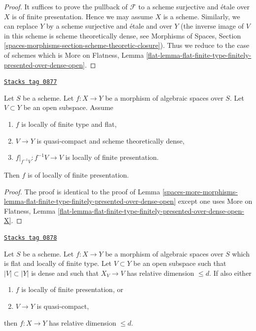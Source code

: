 \begin{proof}
It suffices to prove the pullback of $\mathcal{F}$ to a scheme surjective
and \'etale over $X$ is of finite presentation. Hence we may assume $X$
is a scheme. Similarly, we can replace $Y$ by a scheme surjective and
\'etale and over $Y$ (the inverse image of $V$ in this scheme is scheme
theoretically dense, see
Morphisms of Spaces, Section
\ref{spaces-morphisms-section-scheme-theoretic-closure}).
Thus we reduce to the case of schemes which is
More on Flatness, Lemma
\ref{flat-lemma-flat-finite-type-finitely-presented-over-dense-open}.
\end{proof}

\begin{lemma}
\label{spaces-more-morphisms-lemma-flat-finite-type-finitely-presented-over-dense-open-X}
\href{https://stacks.math.columbia.edu/tag/0877}{\texttt{Stacks tag 0877}}

Let $S$ be a scheme.
Let $f : X \to Y$ be a morphism of algebraic spaces over $S$.
Let $V \subset Y$ be an open subspace.
Assume
\begin{enumerate}
\item $f$ is locally of finite type and flat,
\item $V \to Y$ is quasi-compact and scheme theoretically dense,
\item $f|_{f^{-1}V} : f^{-1}V \to V$ is locally of finite presentation.
\end{enumerate}
Then $f$ is of locally of finite presentation.
\end{lemma}

\begin{proof}
The proof is identical to the proof of
Lemma \ref{spaces-more-morphisms-lemma-flat-finite-type-finitely-presented-over-dense-open}
except one uses
More on Flatness, Lemma
\ref{flat-lemma-flat-finite-type-finitely-presented-over-dense-open-X}.
\end{proof}

\begin{lemma}
\label{spaces-more-morphisms-lemma-flat-fp-dimension-over-dense-open}
\href{https://stacks.math.columbia.edu/tag/0878}{\texttt{Stacks tag 0878}}

Let $S$ be a scheme. Let $f : X \to Y$ be a morphism of algebraic spaces
over $S$ which is flat and locally of finite type. Let $V \subset Y$ be an
open subspace such that $|V| \subset |Y|$ is dense and such that $X_V \to V$
has relative dimension $\leq d$. If also either
\begin{enumerate}
\item $f$ is locally of finite presentation, or
\item $V \to Y$ is quasi-compact,
\end{enumerate}
then $f : X \to Y$ has relative dimension $\leq d$.
\end{lemma}

